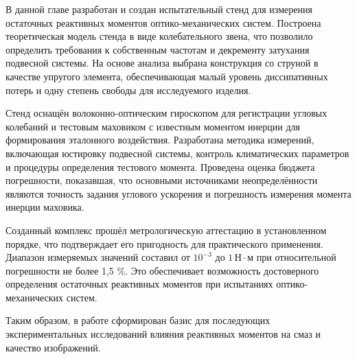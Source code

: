В данной главе разработан и создан испытательный стенд для измерения остаточных реактивных моментов оптико-механических систем.  
Построена теоретическая модель стенда в виде колебательного звена, что позволило определить требования к собственным частотам и декременту затухания подвесной системы. На основе анализа выбрана конструкция со струной в качестве упругого элемента, обеспечивающая малый уровень диссипативных потерь и одну степень свободы для исследуемого изделия.

Стенд оснащён волоконно-оптическим гироскопом для регистрации угловых колебаний и тестовым маховиком с известным моментом инерции для формирования эталонного воздействия. Разработана методика измерений, включающая юстировку подвесной системы, контроль климатических параметров и процедуры определения тестового момента. Проведена оценка бюджета погрешности, показавшая, что основными источниками неопределённости являются точность задания углового ускорения и погрешность измерения момента инерции маховика.

Созданный комплекс прошёл метрологическую аттестацию в установленном порядке, что подтверждает его пригодность для практического применения. Диапазон измеряемых значений составил от $10^{-3}$ до $1 \,\text{Н}\cdot\text{м}$ при относительной погрешности не более 1,5 \%. Это обеспечивает возможность достоверного определения остаточных реактивных моментов при испытаниях оптико-механических систем.

Таким образом, в работе сформирован базис для последующих экспериментальных исследований влияния реактивных моментов на смаз и качество изображений. 



\clearpage
